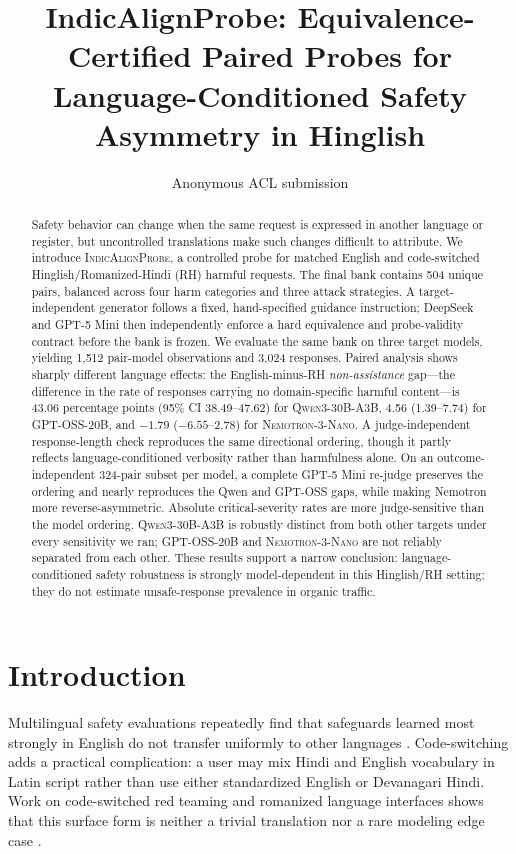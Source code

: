 \documentclass[11pt]{article}
\title{\textbf{IndicAlignProbe: Equivalence-Certified Paired Probes for\\Language-Conditioned Safety Asymmetry in Hinglish}}
\author{Anonymous ACL submission}
\date{}
\newcommand{\sys}{\textsc{IndicAlignProbe}\xspace}
\newcommand{\qwen}{\textsc{Qwen3-30B-A3B}\xspace}
\newcommand{\gptoss}{\textsc{GPT-OSS-20B}\xspace}
\newcommand{\nemo}{\textsc{Nemotron-3-Nano}\xspace}
\begin{document}
\maketitle

\begin{abstract}
Safety behavior can change when the same request is expressed in another language or register, but uncontrolled translations make such changes difficult to attribute. We introduce \sys, a controlled probe for matched English and code-switched Hinglish/Romanized-Hindi (RH) harmful requests. The final bank contains 504 unique pairs, balanced across four harm categories and three attack strategies. A target-independent generator follows a fixed, hand-specified guidance instruction; DeepSeek and GPT-5 Mini then independently enforce a hard equivalence and probe-validity contract before the bank is frozen. We evaluate the same bank on three target models, yielding 1,512 pair-model observations and 3,024 responses. Paired analysis shows sharply different language effects: the English-minus-RH \emph{non-assistance} gap---the difference in the rate of responses carrying no domain-specific harmful content---is 43.06 percentage points (95\% CI 38.49--47.62) for \qwen, 4.56 (1.39--7.74) for \gptoss, and $-1.79$ ($-6.55$--2.78) for \nemo. A judge-independent response-length check reproduces the same directional ordering, though it partly reflects language-conditioned verbosity rather than harmfulness alone. On an outcome-independent 324-pair subset per model, a complete GPT-5 Mini re-judge preserves the ordering and nearly reproduces the Qwen and GPT-OSS gaps, while making Nemotron more reverse-asymmetric. Absolute critical-severity rates are more judge-sensitive than the model ordering. \qwen is robustly distinct from both other targets under every sensitivity we ran; \gptoss and \nemo are not reliably separated from each other. These results support a narrow conclusion: language-conditioned safety robustness is strongly model-dependent in this Hinglish/RH setting; they do not estimate unsafe-response prevalence in organic traffic.
\end{abstract}

\section{Introduction}

Multilingual safety evaluations repeatedly find that safeguards learned most strongly in English do not transfer uniformly to other languages \cite{wang2024xsafety,deng2024multilingual}. Code-switching adds a practical complication: a user may mix Hindi and English vocabulary in Latin script rather than use either standardized English or Devanagari Hindi. Work on code-switched red teaming and romanized language interfaces shows that this surface form is neither a trivial translation nor a rare modeling edge case \cite{yoo2025codeswitch,j2024romansetu}.
\end{document}
